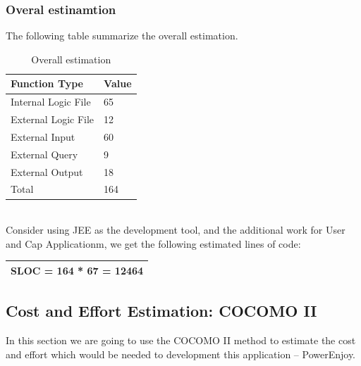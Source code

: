 \documentclass{article}
\begin{document}
	\subsubsection{Overal estinamtion}
	The following table summarize the overall estimation. \\
	\begin{table}[h]
		\centering
		\caption{Overall estimation}
		\label{my-label}
		\begin{tabular}{|l|l|}
			\hline
			Function Type       & Value \\ \hline
			Internal Logic File & 65    \\ \hline
			External Logic File & 12    \\ \hline
			External Input      & 60    \\ \hline
			External Query      & 9     \\ \hline
			External Output     & 18    \\ \hline
			Total               & 164   \\ \hline
		\end{tabular}
	\end{table}
\\Consider using JEE as the development tool, and the additional work for User and Cap Applicationm, we get the following estimated lines of code:
\begin{table}[h]
	\centering
	\label{my-label}
	\begin{tabular}{|l|}
		\hline
		SLOC = 164 * 67 = 12464 \\ \hline
	\end{tabular}
\end{table}

\newpage
	\subsection{Cost and Effort Estimation: COCOMO II}
In this section we are going to use the COCOMO II method to estimate the cost and effort which would be needed to development this application -- PowerEnjoy.
\end{document}
